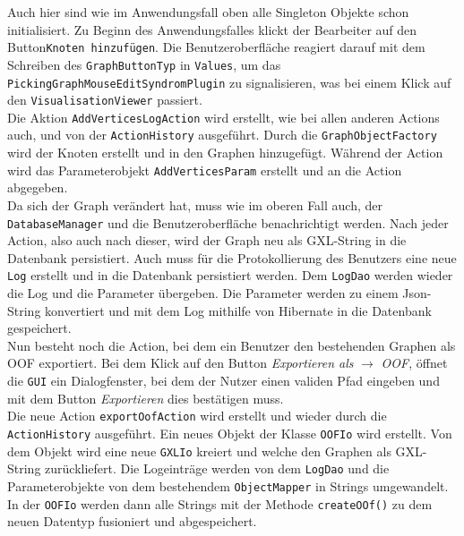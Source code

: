 \documentclass[enabledeprecatedfontcommands,fontsize=11pt,paper=a4,twoside]{scrartcl}
\begin{document}
Auch hier sind wie im Anwendungsfall oben alle Singleton Objekte schon initialisiert. Zu Beginn des Anwendungsfalles klickt der Bearbeiter auf den Button\texttt{Knoten hinzufügen}. Die Benutzeroberfläche reagiert darauf mit dem Schreiben des \texttt{GraphButtonTyp} in \texttt{Values}, um das \texttt{PickingGraphMouseEditSyndromPlugin} zu signalisieren, was bei einem Klick auf den \texttt{VisualisationViewer} passiert.\\
Die Aktion \texttt{AddVerticesLogAction} wird erstellt, wie bei allen anderen Actions auch, und von der \texttt{ActionHistory} ausgeführt. Durch die \texttt{GraphObjectFactory} wird der Knoten erstellt und in den Graphen hinzugefügt. Während der Action wird das Parameterobjekt \texttt{AddVerticesParam} erstellt und an die Action abgegeben.\\  
Da sich der Graph verändert hat, muss wie im oberen Fall auch, der \texttt{DatabaseManager} und die Benutzeroberfläche benachrichtigt werden. Nach jeder Action, also auch nach dieser, wird der Graph neu als GXL-String in die Datenbank persistiert. Auch muss für die Protokollierung des Benutzers eine neue \texttt{Log} erstellt und in die Datenbank persistiert werden. Dem \texttt{LogDao} werden wieder die Log und die Parameter übergeben. Die Parameter werden zu einem Json-String konvertiert und mit dem Log mithilfe von Hibernate in die Datenbank gespeichert.\\
Nun besteht noch die Action, bei dem ein Benutzer den bestehenden Graphen als OOF exportiert. Bei dem Klick auf den Button \textit{Exportieren als} $\rightarrow$ \textit{OOF}, öffnet die \texttt{GUI} ein Dialogfenster, bei dem der Nutzer einen validen Pfad eingeben und mit dem Button \textit{Exportieren} dies bestätigen muss. \\
Die neue Action \texttt{exportOofAction} wird erstellt und wieder durch die \texttt{ActionHistory} ausgeführt. Ein neues Objekt der Klasse \texttt{OOFIo} wird erstellt. Von dem Objekt wird eine neue \texttt{GXLIo} kreiert und welche den Graphen als GXL-String zurückliefert. Die Logeinträge werden von dem \texttt{LogDao} und die Parameterobjekte von dem bestehendem \texttt{ObjectMapper} in Strings umgewandelt. In der \texttt{OOFIo} werden dann alle Strings mit der Methode \texttt{createOOf()} zu dem neuen Datentyp fusioniert und abgespeichert.  



\end{document}
